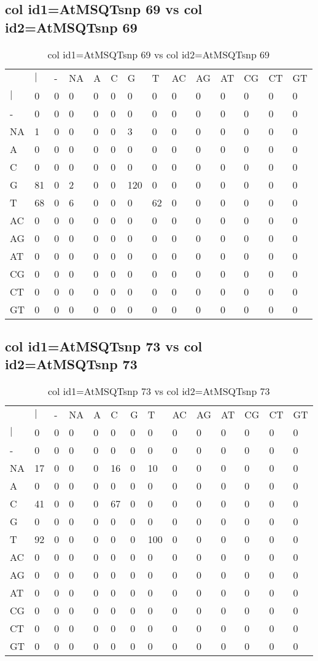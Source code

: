 \subsection{col id1=AtMSQTsnp 69 vs col id2=AtMSQTsnp 69}
\begin{center}
\begin{longtable}{|l|l|l|l|l|l|l|l|l|l|l|l|l|l|}
\caption{col id1=AtMSQTsnp 69 vs col id2=AtMSQTsnp 69} \label{table_dm962}\\
\hline
\\
\hline
&$|$&-&NA&A&C&G&T&AC&AG&AT&CG&CT&GT\\
$|$&0&0&0&0&0&0&0&0&0&0&0&0&0\\
-&0&0&0&0&0&0&0&0&0&0&0&0&0\\
NA&1&0&0&0&0&3&0&0&0&0&0&0&0\\
A&0&0&0&0&0&0&0&0&0&0&0&0&0\\
C&0&0&0&0&0&0&0&0&0&0&0&0&0\\
G&81&0&2&0&0&120&0&0&0&0&0&0&0\\
T&68&0&6&0&0&0&62&0&0&0&0&0&0\\
AC&0&0&0&0&0&0&0&0&0&0&0&0&0\\
AG&0&0&0&0&0&0&0&0&0&0&0&0&0\\
AT&0&0&0&0&0&0&0&0&0&0&0&0&0\\
CG&0&0&0&0&0&0&0&0&0&0&0&0&0\\
CT&0&0&0&0&0&0&0&0&0&0&0&0&0\\
GT&0&0&0&0&0&0&0&0&0&0&0&0&0\\
\hline
\end{longtable}
\end{center}

\subsection{col id1=AtMSQTsnp 73 vs col id2=AtMSQTsnp 73}
\begin{center}
\begin{longtable}{|l|l|l|l|l|l|l|l|l|l|l|l|l|l|}
\caption{col id1=AtMSQTsnp 73 vs col id2=AtMSQTsnp 73} \label{table_dm964}\\
\hline
\\
\hline
&$|$&-&NA&A&C&G&T&AC&AG&AT&CG&CT&GT\\
$|$&0&0&0&0&0&0&0&0&0&0&0&0&0\\
-&0&0&0&0&0&0&0&0&0&0&0&0&0\\
NA&17&0&0&0&16&0&10&0&0&0&0&0&0\\
A&0&0&0&0&0&0&0&0&0&0&0&0&0\\
C&41&0&0&0&67&0&0&0&0&0&0&0&0\\
G&0&0&0&0&0&0&0&0&0&0&0&0&0\\
T&92&0&0&0&0&0&100&0&0&0&0&0&0\\
AC&0&0&0&0&0&0&0&0&0&0&0&0&0\\
AG&0&0&0&0&0&0&0&0&0&0&0&0&0\\
AT&0&0&0&0&0&0&0&0&0&0&0&0&0\\
CG&0&0&0&0&0&0&0&0&0&0&0&0&0\\
CT&0&0&0&0&0&0&0&0&0&0&0&0&0\\
GT&0&0&0&0&0&0&0&0&0&0&0&0&0\\
\hline
\end{longtable}
\end{center}

